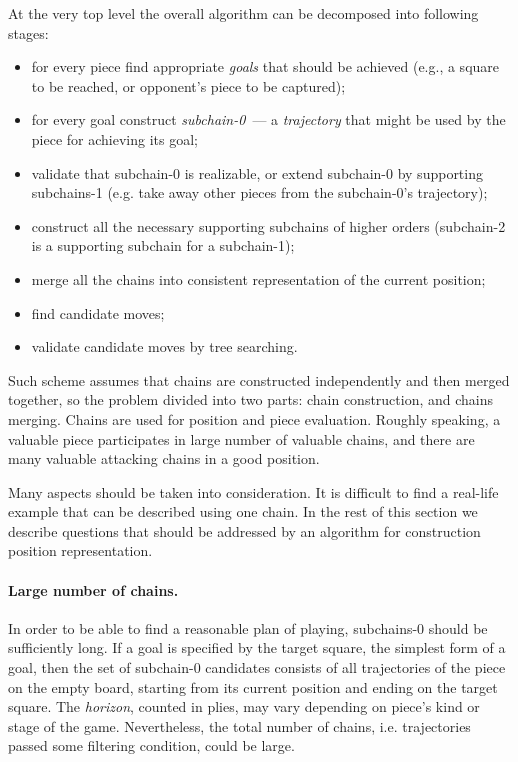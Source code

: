 \documentclass{llncs}
\begin{document}
At the very top level the overall algorithm can be decomposed into
following stages:
\begin{itemize}
\item for every piece find appropriate \emph{goals} that should be
  achieved (e.g., a square to be reached, or opponent's piece to be captured);
\item for every goal construct \emph{subchain-0}~--- a \emph{trajectory} that
  might be used by the piece for achieving its goal;
\item validate that subchain-0 is realizable, or extend subchain-0 by
  supporting subchains-1 (e.g. take away other pieces from the
  subchain-0's trajectory);
\item construct all the necessary supporting subchains of higher
  orders (subchain-2 is a supporting subchain for a subchain-1);
\item merge all the chains into consistent representation of the current position;
\item find candidate moves;
\item validate candidate moves by tree searching.
\end{itemize}
Such scheme assumes that chains are constructed independently and then
merged together, so the problem divided into two parts: chain
construction, and chains merging. Chains are used for position and
piece evaluation. Roughly speaking, a valuable piece participates in
large number of valuable chains, and there are many valuable attacking
chains in a good position.

Many aspects should be taken into consideration. It is difficult to
find a real-life example that can be described using one chain. In the
rest of this section we describe questions that should be addressed by
an algorithm for construction position representation.

\paragraph{Large number of chains.} In order to be able to find a
reasonable plan of playing, subchains-0 should be sufficiently
long. If a goal is specified by the target square, the simplest form
of a goal, then the set of subchain-0 candidates consists of all
trajectories of the piece on the empty board, starting from its
current position and ending on the target square. The \emph{horizon},
counted in plies, may vary depending on piece's kind or stage of the
game. Nevertheless, the total number of chains, i.e. trajectories
passed some filtering condition, could be large.
\end{document}
